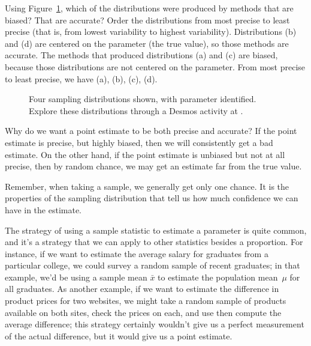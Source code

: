 \begin{examplewrap}
\begin{nexample}
{Using Figure~\ref{fourSamplingDistributions}, which of the distributions were produced by methods that are biased?  That are accurate?  Order the distributions from most precise to least precise (that is, from lowest variability to highest variability).}
Distributions (b) and (d) are centered on the parameter (the true value), so those methods are accurate.  The methods that produced distributions (a) and (c) are biased, because those distributions are not centered on the parameter.  From most precise to least precise, we have (a), (b), (c), (d).
\end{nexample}
\end{examplewrap}

\begin{figure}[h]
   \centering
{}
   \caption{Four sampling distributions shown, with parameter identified. Explore these distributions through a Desmos activity at .}
   \label{fourSamplingDistributions}
\end{figure}

\begin{examplewrap}
\begin{nexample}
{Why do we want a point estimate to be both precise and accurate?} If the point estimate is precise, but highly biased, then we will consistently get a bad estimate.  On the other hand, if the point estimate is unbiased but not at all precise, then by random chance, we may get an estimate far from the true value.  

Remember, when taking a sample, we generally get only one chance.  It is the properties of the sampling distribution that tell us how much confidence we can have in the estimate. \end{nexample}
\end{examplewrap}

The strategy of using a sample statistic to estimate
a parameter is quite common, and it's a strategy that
we can apply to other statistics besides a proportion.
For instance, if we want to estimate the average salary
for graduates from a particular college, we could
survey a random sample of recent graduates;
in that example, we'd be using a sample mean $\bar{x}$
to estimate the population mean~$\mu$ for all graduates.
As another example, if we want to estimate the
difference in product prices for two websites,
we might take a random sample of products available
on both sites, check the prices on each,
and use then compute the average difference;
this strategy certainly wouldn't give us a perfect
measurement of the actual difference, but it would
give us a point estimate.

